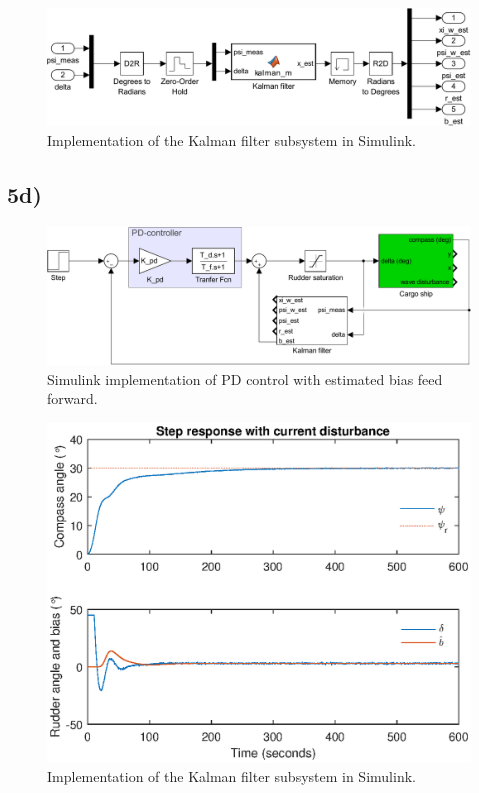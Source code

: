 \begin{figure}
    \centering
    \includegraphics[width=\textwidth]{images/oppg5/c_kalman.pdf}
    \caption{Implementation of the Kalman filter subsystem in Simulink.}
    \label{fig:kalman_subsys}
\end{figure}

\subsection{5d)}

\begin{figure}
    \centering
    \includegraphics[width=\textwidth]{images/oppg5/bias_FF.pdf}
    \caption{Simulink implementation of PD control with estimated bias feed forward.}
    \label{fig:bias_ff}
\end{figure}

\begin{figure}
    \centering
    \includegraphics[width=\textwidth]{images/oppg5/5d.eps}
    \caption{Implementation of the Kalman filter subsystem in Simulink.}
    \label{fig:kalman_subsys}
\end{figure}


